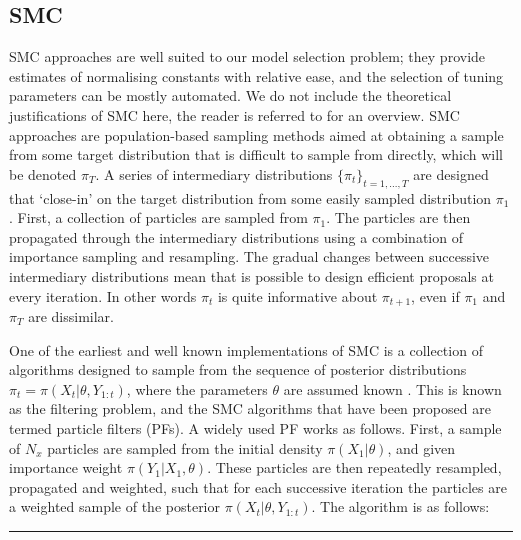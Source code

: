 \documentclass[a4paper,12pt]{article}
\begin{document}
\subsection{SMC}

SMC approaches are well suited to our model selection problem; they provide estimates of normalising constants with relative ease, and the selection of tuning parameters can be mostly automated.
We do not include the theoretical justifications of SMC here, the reader is referred to \cite{DelMoral2006} for an overview.
SMC approaches are population-based sampling methods aimed at obtaining a sample from some target distribution that is difficult to sample from directly, which will be denoted $\pi_T$.
A series of intermediary distributions $\{ \pi_t \}_{t=1,...,T}$ are designed that `close-in' on the target distribution from some easily sampled distribution $\pi_1$.
First, a collection of particles are sampled from $\pi_1$.
The particles are then propagated through the intermediary distributions using a combination of importance sampling and resampling.
The gradual changes between successive intermediary distributions mean that is possible to design efficient proposals at every iteration.
In other words $\pi_t$ is quite informative about $\pi_{t+1}$, even if $\pi_1$ and $\pi_T$ are dissimilar.

One of the earliest and well known implementations of SMC is a collection of algorithms designed to sample from the sequence of posterior distributions $\pi_t = \pi(X_t \vert \theta, Y_{1:t})$, where the parameters $\theta$ are assumed known \cite{Gordon1993}.
This is known as the filtering problem, and the SMC algorithms that have been proposed are termed particle filters (PFs).
A widely used PF works as follows.
First, a sample of $N_x$ particles are sampled from the initial density $\pi (X_1 \vert \theta)$, and given importance weight $\pi (Y_1 \vert X_1, \theta)$.
These particles are then repeatedly resampled, propagated and weighted, such that for each successive iteration the particles are a weighted sample of the posterior $\pi(X_t \vert \theta, Y_{1:t})$.
The algorithm is as follows:

\noindent \rule{\textwidth}{1pt}\\
\end{document}
